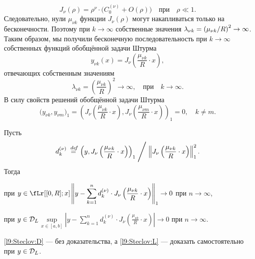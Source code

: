 \begin{equation*}
	 J_{\nu}(\rho)=\rho^{\nu}\cdot\Big(C_0^{(\nu)}+O(\rho)\Big)\quad\text{при}\quad\rho\ll1.
\end{equation*}
Следовательно, нули $\mu_{\nu k}$ функции $J_{\nu}(\rho)$ могут накапливаться только на бесконечности. Поэтому при $k\to\infty$ собственные значения $\lambda_{\nu k}\?=\left(\mu_{\nu k}/R\right)^2\to\infty$. Таким образом{\mb,} мы получили бесконечную последовательность при $k\to\infty$ собственных функций обобщённой задачи Штурма
\begin{equation*}
	 y_{\nu k}(x)=J_{\nu}\left(\frac{\mu_{\nu k}}{R}\cdot x\right),
\end{equation*}
отвечающих собственным значениям 
\begin{equation*}
	 \lambda_{\nu k}=\left(\frac{\mu_{\nu k}}{R}\right)^2\to\infty,\quad\text{при}\quad k\to\infty.
\end{equation*}
В силу свойств решений обобщённой задачи Штурма 
\begin{equation*}
	\big(y_{\nu k},y_{\nu m}\big)_1=\left(J_{\nu}\left(\frac{\mu_{\nu k}}{R}\cdot x\right),J_{\nu}\left(\frac{\mu_{\nu m}}{R}\cdot x\right)\right)_1=0,\quad k\neq m.
\end{equation*}
\begin{Teor}
	Пусть
	\begin{equation*}
		 d_k^{(\nu)}\stackrel{\hspace{0.09 cm}de\!f}{=}\left(y,J_{\nu}\left(\frac{\mu_{\nu k}}{R}\cdot x\right)\right)_1\Biggm/\left\|J_{\nu}\left(\frac{\mu_{\nu k}}{R}\cdot x\right)\right\|_1^2.
	\end{equation*} 
	Тогда 
	\begin{enumerateP1}
		\item\label{l9:Steclov:L}при $y\in\fLr[{[0,R];x}]$\quad $\displaystyle\left\|y-\sum\limits_{k=1}^{n}d_k^{(\nu)}\cdot J_{\nu}\left(\frac{\mu_{\nu k}}{R}\cdot x\right)\right\|_1\to0$ при $n\to\infty$,
		\item\label{l9:Steclov:D}при $y\in\mathcal{D}_L$\quad$\displaystyle\sup\limits_{x\in[a,b]}\left|y-\sum\limits_{k=1}^{n}d_k^{(\nu)}\cdot J_{\nu}\left(\frac{\mu_{\nu k}}{R}\cdot x\right)\right|\to0$ при $n\to\infty$. 
	\end{enumerateP1} 
\end{Teor}
\noindent\ref{l9:Steclov:D} --- без доказательства, а \ref{l9:Steclov:L} --- доказать самостоятельно при $y\?\in\mc{D}_L$. 


